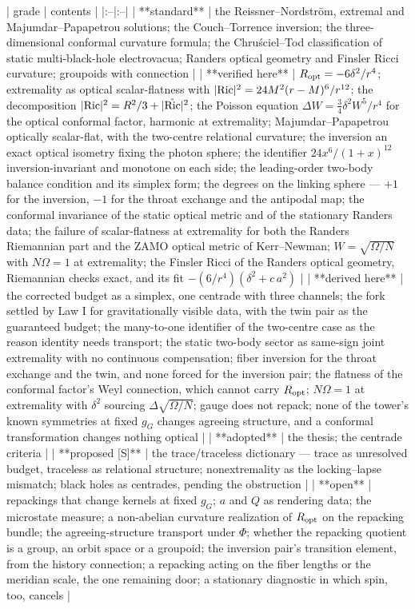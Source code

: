 | grade | contents |
|:--|:--|
| **standard** | the Reissner–Nordström, extremal and Majumdar–Papapetrou solutions; the Couch–Torrence inversion; the three-dimensional conformal curvature formula; the Chruściel–Tod classification of static multi-black-hole electrovacua; Randers optical geometry and Finsler Ricci curvature; groupoids with connection |
| **verified here** | $R_{\rm opt} = -6\delta^2/r^4$; extremality as optical scalar-flatness with $\vert{\rm Ric}\vert^2 = 24M^2(r-M)^6/r^{12}$; the decomposition $\vert{\rm Ric}\vert^2 = R^2/3+\vert\mathring{\rm Ric}\vert^2$; the Poisson equation $\Delta W = \tfrac34\delta^2W^5/r^4$ for the optical conformal factor, harmonic at extremality; Majumdar–Papapetrou optically scalar-flat, with the two-centre relational curvature; the inversion an exact optical isometry fixing the photon sphere; the identifier $24x^6/(1+x)^{12}$ inversion-invariant and monotone on each side; the leading-order two-body balance condition and its simplex form; the degrees on the linking sphere — $+1$ for the inversion, $-1$ for the throat exchange and the antipodal map; the conformal invariance of the static optical metric and of the stationary Randers data; the failure of scalar-flatness at extremality for both the Randers Riemannian part and the ZAMO optical metric of Kerr–Newman; $W = \sqrt{\Omega/N}$ with $N\Omega = 1$ at extremality; the Finsler Ricci of the Randers optical geometry, Riemannian checks exact, and its fit $-(6/r^4)(\delta^2+c\,a^2)$ |
| **derived here** | the corrected budget as a simplex, one centrade with three channels; the fork settled by Law I for gravitationally visible data, with the twin pair as the guaranteed budget; the many-to-one identifier of the two-centre case as the reason identity needs transport; the static two-body sector as same-sign joint extremality with no continuous compensation; fiber inversion for the throat exchange and the twin, and none forced for the inversion pair; the flatness of the conformal factor's Weyl connection, which cannot carry $R_{\rm opt}$; $N\Omega = 1$ at extremality with $\delta^2$ sourcing $\Delta\sqrt{\Omega/N}$; gauge does not repack; none of the tower's known symmetries at fixed $g_G$ changes agreeing structure, and a conformal transformation changes nothing optical |
| **adopted** | the thesis; the centrade criteria |
| **proposed [S]** | the trace/traceless dictionary — trace as unresolved budget, traceless as relational structure; nonextremality as the locking–lapse mismatch; black holes as centrades, pending the obstruction |
| **open** | repackings that change kernels at fixed $g_G$; $a$ and $Q$ as rendering data; the microstate measure; a non-abelian curvature realization of $R_{\rm opt}$ on the repacking bundle; the agreeing-structure transport under $\Phi$; whether the repacking quotient is a group, an orbit space or a groupoid; the inversion pair's transition element, from the history connection; a repacking acting on the fiber lengths or the meridian scale, the one remaining door; a stationary diagnostic in which spin, too, cancels |

